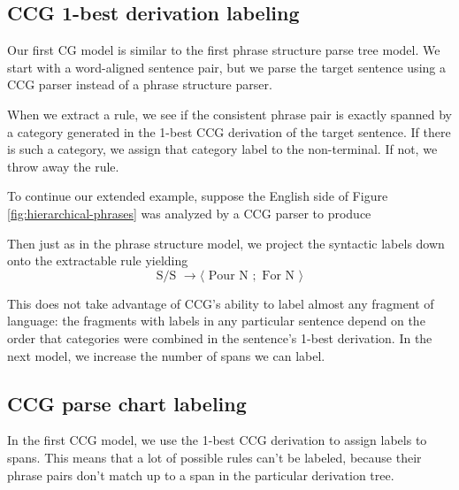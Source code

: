 \documentclass[a4paper]{article}
\begin{document}
\subsection{CCG 1-best derivation labeling}

Our first CG model is similar to the first phrase structure parse tree model. We start with a word-aligned sentence pair, but we parse the target sentence using a CCG parser instead of a phrase structure parser.

When we extract a rule, we see if the consistent phrase pair is exactly spanned by a category generated in the 1-best CCG derivation of the target sentence. If there is such a category, we assign that category label to the non-terminal. If not, we throw away the rule.

To continue our extended example, suppose the English side of Figure \ref{fig:hierarchical-phrases} was analyzed by a CCG parser to produce
\begin{center}
\end{center}
Then just as in the phrase structure model, we project the syntactic labels down onto the extractable rule yielding
\begin{equation}
\textrm{S/S } \to \langle \textrm{ Pour N }; \textrm{ For N } \rangle
\end{equation}

This does not take advantage of CCG's ability to label almost any fragment of language: the fragments with labels in any particular sentence depend on the order that categories were combined in the sentence's 1-best derivation. In the next model, we increase the number of spans we can label.

\subsection{CCG parse chart labeling}

In the first CCG model, we use the 1-best CCG derivation to assign labels to spans. This means that a lot of possible rules can't be labeled, because their phrase pairs don't match up to a span in the particular derivation tree.
\end{document}

